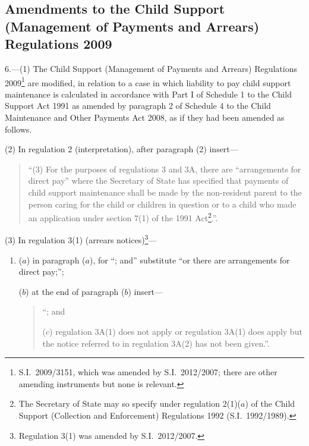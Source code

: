 \documentclass[12pt,a4paper]{article}
\begin{document}
\subsection[6. Amendments to the Child Support (Management of Payments and Arrears) Regulations 2009]{\sloppy Amendments to the Child Support (Management of Payments and Arrears) Regulations 2009}

6.—(1) The Child Support (Management of Payments and Arrears) Regulations 2009\footnote{S.I.~2009/3151, which was amended by S.I.~2012/2007; there are other amending instruments but none is relevant.} 
are modified, in relation to a case in which liability to pay child support maintenance is calculated in accordance with Part I of Schedule 1 to the Child Support Act 1991 as amended by paragraph 2 of Schedule 4 to the Child Maintenance and Other Payments Act 2008, as if they had been amended  %
as follows.

(2) In regulation 2 (interpretation), after paragraph (2) insert—
\begin{quotation}
“(3) For the purposes of regulations 3 and 3A, there are “arrangements for direct pay” where the Secretary of State has specified that payments of child support maintenance shall be made by the non-resident parent to the person caring for the child or children in question or to a child who made an application under section 7(1) of the 1991 Act\footnote{The Secretary of State may so specify under regulation 2(1)($a$)  of the Child Support (Collection and Enforcement) Regulations 1992 (S.I.~1992/1989).}.”.
\end{quotation}

(3) In regulation 3(1) (arrears notices)\footnote{Regulation 3(1) was amended by S.I.~2012/2007.}—
\begin{enumerate}\item[]
($a$) in paragraph ($a$), for “; and” substitute “or there are arrangements for direct pay;”;

($b$) at the end of paragraph ($b$)  insert—
\begin{quotation}
“; and

($c$) regulation 3A(1) does not apply or regulation 3A(1) does apply but the notice referred to in regulation 3A(2) has not been given.”.
\end{quotation}
\end{enumerate}
\end{document}
